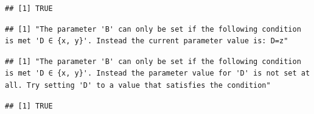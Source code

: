 \documentclass[]{article}
\newenvironment{Shaded}{\begin{snugshade}}{\end{snugshade}}
\newcommand{\CommentTok}[1]{\textcolor[rgb]{0.56,0.35,0.01}{\textit{#1}}}
\newcommand{\DataTypeTok}[1]{\textcolor[rgb]{0.13,0.29,0.53}{#1}}
\newcommand{\DecValTok}[1]{\textcolor[rgb]{0.00,0.00,0.81}{#1}}
\newcommand{\KeywordTok}[1]{\textcolor[rgb]{0.13,0.29,0.53}{\textbf{#1}}}
\newcommand{\NormalTok}[1]{#1}
\newcommand{\OperatorTok}[1]{\textcolor[rgb]{0.81,0.36,0.00}{\textbf{#1}}}
\newcommand{\OtherTok}[1]{\textcolor[rgb]{0.56,0.35,0.01}{#1}}
\newcommand{\StringTok}[1]{\textcolor[rgb]{0.31,0.60,0.02}{#1}}
\renewenvironment{Shaded} {\begin{snugshade}\small} {\end{snugshade}}
\begin{document}
\begin{verbatim}
## [1] TRUE
\end{verbatim}

\begin{Shaded}
\end{Shaded}

\begin{verbatim}
## [1] "The parameter 'B' can only be set if the following condition is met 'D ∈ {x, y}'. Instead the current parameter value is: D=z"
\end{verbatim}

\begin{Shaded}
\end{Shaded}

\begin{verbatim}
## [1] "The parameter 'B' can only be set if the following condition is met 'D ∈ {x, y}'. Instead the parameter value for 'D' is not set at all. Try setting 'D' to a value that satisfies the condition"
\end{verbatim}

\begin{Shaded}
\end{Shaded}

\begin{verbatim}
## [1] TRUE
\end{verbatim}

\begin{Shaded}
\end{Shaded}
\end{document}
